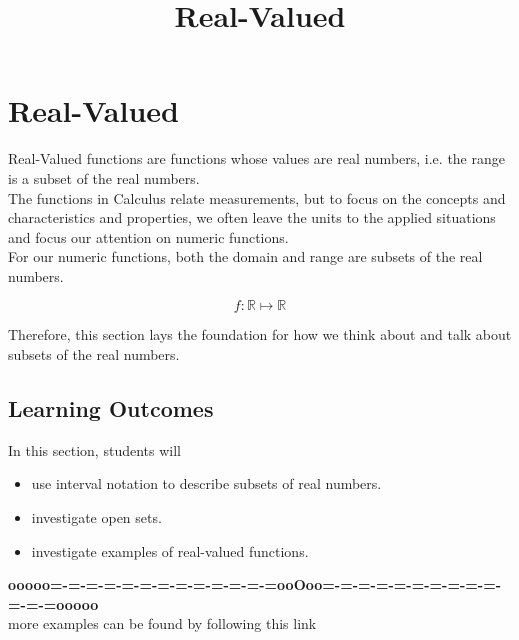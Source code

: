 \documentclass{ximera}
\title{Real-Valued}
\begin{document}
\begin{abstract}
\end{abstract}
\maketitle




\section{Real-Valued}


Real-Valued functions are functions whose values are real numbers, i.e. the range is a subset of the real numbers. \\


The functions in Calculus relate measurements, but to focus on the concepts and characteristics and properties, we often leave the units to the applied situations and focus our attention on numeric functions. \\


For our numeric functions, both the domain and range are subsets of the real numbers. 

\[
f : \mathbb{R} \mapsto \mathbb{R}
\]


Therefore, this section lays the foundation for how we think about and talk about subsets of the real numbers.










\subsection{Learning Outcomes}





\begin{sectionOutcomes}
In this section, students will 

\begin{itemize}
\item use interval notation to describe subsets of real numbers.
\item investigate open sets.
\item investigate examples of real-valued functions.
\end{itemize}
\end{sectionOutcomes}










\begin{center}
\textbf{\textcolor{green!50!black}{ooooo=-=-=-=-=-=-=-=-=-=-=-=-=ooOoo=-=-=-=-=-=-=-=-=-=-=-=-=ooooo}} \\

more examples can be found by following this link\\ 

\end{center}
\end{document}
